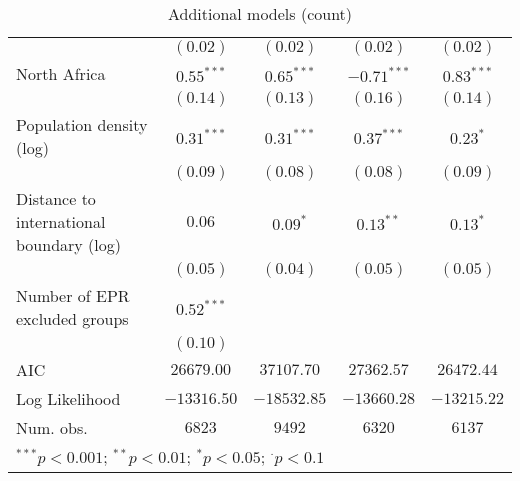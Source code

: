 \begin{sidewaystable}
\begin{center}
{\begin{tabular}{l c c c c}
                                         & $(0.02)$     & $(0.02)$        & $(0.02)$      & $(0.02)$      \\
North Africa                             & $0.55^{***}$ & $0.65^{***}$    & $-0.71^{***}$ & $0.83^{***}$  \\
                                         & $(0.14)$     & $(0.13)$        & $(0.16)$      & $(0.14)$      \\
Population density (log)                 & $0.31^{***}$ & $0.31^{***}$    & $0.37^{***}$  & $0.23^{*}$    \\
                                         & $(0.09)$     & $(0.08)$        & $(0.08)$      & $(0.09)$      \\
Distance to international boundary (log) & $0.06$       & $0.09^{*}$      & $0.13^{**}$   & $0.13^{*}$    \\
                                         & $(0.05)$     & $(0.04)$        & $(0.05)$      & $(0.05)$      \\
Number of EPR excluded groups            & $0.52^{***}$ &                 &               &               \\
                                         & $(0.10)$     &                 &               &               \\
\midrule
AIC                                      & $26679.00$   & $37107.70$      & $27362.57$    & $26472.44$    \\
Log Likelihood                           & $-13316.50$  & $-18532.85$     & $-13660.28$   & $-13215.22$   \\
Num. obs.                                & $6823$       & $9492$          & $6320$        & $6137$        \\
\bottomrule
\multicolumn{5}{l}{\scriptsize{$^{***}p<0.001$; $^{**}p<0.01$; $^{*}p<0.05$; $^{\cdot}p<0.1$}}
\end{tabular}
}
\caption{Additional models (count)}
\label{robustc}
\end{center}
\end{sidewaystable}
